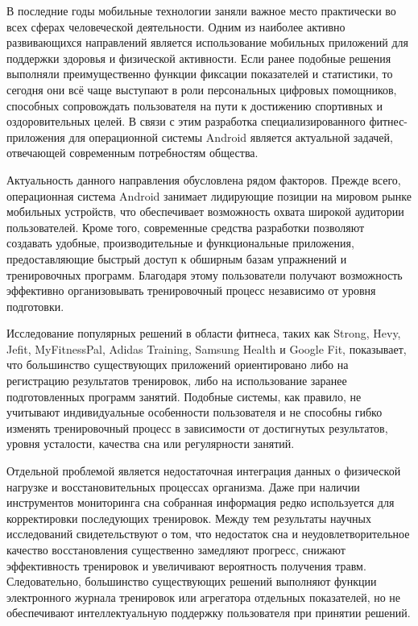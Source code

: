 
В последние годы мобильные технологии заняли важное место практически во всех сферах человеческой деятельности. Одним из наиболее активно развивающихся направлений является использование мобильных приложений для поддержки здоровья и физической активности. Если ранее подобные решения выполняли преимущественно функции фиксации показателей и статистики, то сегодня они всё чаще выступают в роли персональных цифровых помощников, способных сопровождать пользователя на пути к достижению спортивных и оздоровительных целей. В связи с этим разработка специализированного фитнес-приложения для операционной системы Android является актуальной задачей, отвечающей современным потребностям общества.

Актуальность данного направления обусловлена рядом факторов. Прежде всего, операционная система Android занимает лидирующие позиции на мировом рынке мобильных устройств, что обеспечивает возможность охвата широкой аудитории пользователей. Кроме того, современные средства разработки позволяют создавать удобные, производительные и функциональные приложения, предоставляющие быстрый доступ к обширным базам упражнений и тренировочных программ. Благодаря этому пользователи получают возможность эффективно организовывать тренировочный процесс независимо от уровня подготовки.

Исследование популярных решений в области фитнеса, таких как Strong, Hevy, Jefit, MyFitnessPal, Adidas Training, Samsung Health и Google Fit, показывает, что большинство существующих приложений ориентировано либо на регистрацию результатов тренировок, либо на использование заранее подготовленных программ занятий. Подобные системы, как правило, не учитывают индивидуальные особенности пользователя и не способны гибко изменять тренировочный процесс в зависимости от достигнутых результатов, уровня усталости, качества сна или регулярности занятий.

Отдельной проблемой является недостаточная интеграция данных о физической нагрузке и восстановительных процессах организма. Даже при наличии инструментов мониторинга сна собранная информация редко используется для корректировки последующих тренировок. Между тем результаты научных исследований свидетельствуют о том, что недостаток сна и неудовлетворительное качество восстановления существенно замедляют прогресс, снижают эффективность тренировок и увеличивают вероятность получения травм. Следовательно, большинство существующих решений выполняют функции электронного журнала тренировок или агрегатора отдельных показателей, но не обеспечивают интеллектуальную поддержку пользователя при принятии решений.

